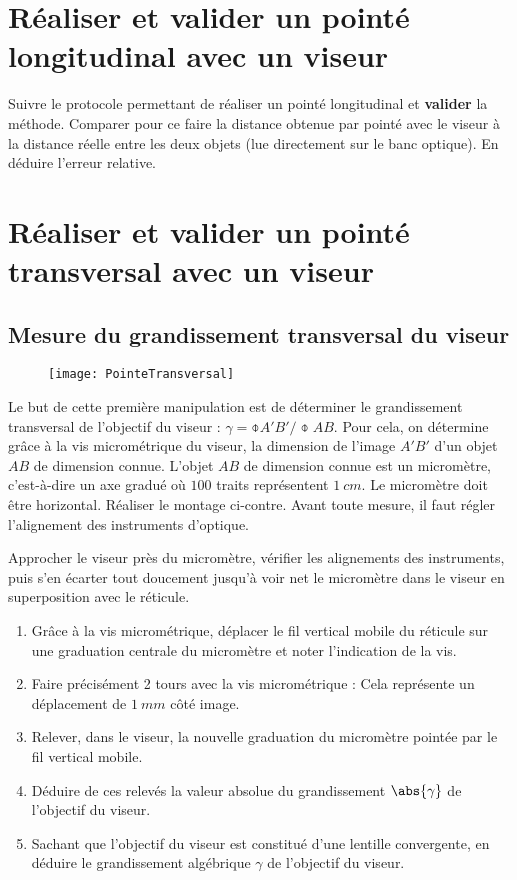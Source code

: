 \documentclass[a4paper, 12pt, final, garamond]{book}
\begin{document}
\section{Réaliser et valider un pointé longitudinal avec un viseur}

Suivre le protocole permettant de réaliser un pointé longitudinal et
\textbf{valider} la méthode. Comparer pour ce faire la distance obtenue par
pointé avec le viseur à la distance réelle entre les deux objets (lue
directement sur le banc optique). En déduire l'erreur relative. 

\section{Réaliser et valider un pointé transversal avec un viseur}
\subsection{Mesure du grandissement transversal du viseur}

\begin{wrapfigure}{r}{0.62\textwidth} 
    \begin{center}
        \texttt{[image: PointeTransversal]}
    \end{center}
\end{wrapfigure} 

Le but de cette première manipulation est de déterminer le grandissement
transversal de l'objectif du viseur : $\gamma = \obar{A'B'}/\obar{AB}$. Pour
cela, on détermine grâce à la vis micrométrique du viseur, la dimension de
l'image $A'B'$ d'un objet $AB$ de dimension connue. L'objet $AB$ de dimension
connue est un micromètre, c'est-à-dire un axe gradué où $100$ traits
représentent $\SI{1}{cm}$. Le micromètre doit être horizontal. Réaliser le
montage ci-contre. Avant toute mesure, il faut régler l'alignement des
instruments d'optique.

\medskip

Approcher le viseur près du micromètre, vérifier les alignements des
instruments, puis s'en écarter tout doucement jusqu'à voir net le micromètre
dans le viseur en superposition avec le réticule.

\begin{enumerate}
    \item Grâce à la vis micrométrique, déplacer le fil vertical mobile du
        réticule sur une graduation centrale du micromètre et noter l'indication
        de la vis.
    \item Faire précisément 2 tours avec la vis micrométrique : Cela représente
        un déplacement de $\SI{1}{mm}$ côté image.
    \item Relever, dans le viseur, la nouvelle graduation du micromètre pointée
        par le fil vertical mobile.
    \item Déduire de ces relevés la valeur absolue du grandissement
        $\abs{\gamma}$ de l'objectif du viseur.
    \item Sachant que l'objectif du viseur est constitué d'une lentille
        convergente, en déduire le grandissement algébrique $\gamma$ de
        l'objectif du viseur.
\end{enumerate}
\end{document}
